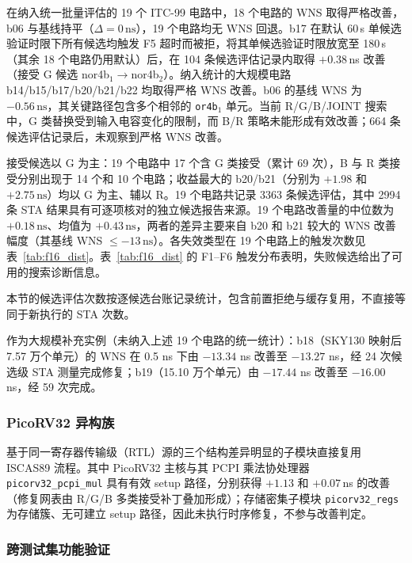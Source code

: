 \documentclass[twocolumn,10pt,fontset=windows]{ctexart}
\begin{document}
在纳入统一批量评估的 19 个 ITC-99 电路中，18 个电路的 WNS 取得严格改善，b06 与基线持平（$\Delta = 0\,\text{ns}$），19 个电路均无 WNS 回退。b17 在默认 60\,s 单候选验证时限下所有候选均触发 F5 超时而被拒，将其单候选验证时限放宽至 180\,s（其余 18 个电路仍用默认）后，在 104 条候选评估记录内取得 $+0.38\,$ns 改善（接受 G 候选 nor4b$_1\!\to\!$nor4b$_2$）。纳入统计的大规模电路 b14/b15/b17/b20/b21/b22 均取得严格 WNS 改善。b06 的基线 WNS 为 $-0.56\,\text{ns}$，其关键路径包含多个相邻的 \texttt{or4b$_1$} 单元。当前 R/G/B/JOINT 搜索中，G 类替换受到输入电容变化的限制，而 B/R 策略未能形成有效改善；664 条候选评估记录后，未观察到严格 WNS 改善。

接受候选以 G 为主：19 个电路中 17 个含 G 类接受（累计 69 次），B 与 R 类接受分别出现于 14 个和 10 个电路；收益最大的 b20/b21（分别为 $+1.98$ 和 $+2.75\,\text{ns}$）均以 G 为主、辅以 R。19 个电路共记录 3363 条候选评估，其中 2994 条 STA 结果具有可逐项核对的独立候选报告来源。19 个电路改善量的中位数为 $+0.18\,\text{ns}$、均值为 $+0.43\,\text{ns}$，两者的差异主要来自 b20 和 b21 较大的 WNS 改善幅度（其基线 WNS $\le -13\,\text{ns}$）。各失效类型在 19 个电路上的触发次数见表~\ref{tab:f16_dist}。表~\ref{tab:f16_dist} 的 F1--F6 触发分布表明，失败候选给出了可用的搜索诊断信息。

本节的候选评估次数按逐候选台账记录统计，包含前置拒绝与缓存复用，不直接等同于新执行的 STA 次数。

作为大规模补充实例（未纳入上述 19 个电路的统一统计）：b18（SKY130 映射后 7.57 万个单元）的 WNS 在 0.5 ns 下由 $-13.34$ ns 改善至 $-13.27$ ns，经 24 次候选级 STA 测量完成修复；b19（15.10 万个单元）由 $-17.44$ ns 改善至 $-16.00$ ns，经 59 次完成。

\subsubsection{PicoRV32 异构族}

基于同一寄存器传输级（RTL）源的三个结构差异明显的子模块直接复用 ISCAS89 流程。其中 PicoRV32 主核与其 PCPI 乘法协处理器 \texttt{picorv32\_pcpi\_mul} 具有有效 setup 路径，分别获得 $+1.13$ 和 $+0.07\,$ns 的改善（修复网表由 R/G/B 多类接受补丁叠加形成）；存储密集子模块 \texttt{picorv32\_regs} 为存储簇、无可建立 setup 路径，因此未执行时序修复，不参与改善判定。

\subsubsection{跨测试集功能验证}\label{sec:crossset_validation}
\end{document}
